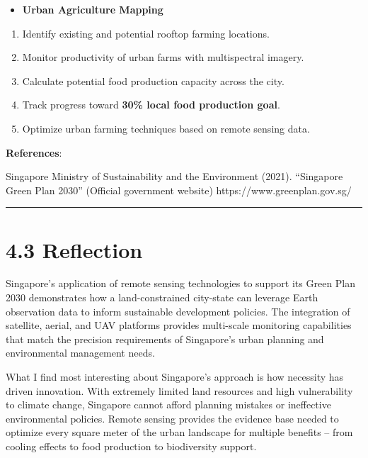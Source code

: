 \documentclass[
  letterpaper,
  DIV=11,
  numbers=noendperiod]{scrreprt}
\providecommand{\tightlist}{%
  \setlength{\itemsep}{0pt}\setlength{\parskip}{0pt}}\usepackage{longtable,booktabs,array}
\begin{document}
\begin{itemize}
\tightlist
\item
  \textbf{Urban Agriculture Mapping}
\end{itemize}

\begin{enumerate}
\def\labelenumi{\arabic{enumi}.}
\tightlist
\item
  Identify existing and potential rooftop farming locations.
\item
  Monitor productivity of urban farms with multispectral imagery.
\item
  Calculate potential food production capacity across the city.
\item
  Track progress toward \textbf{30\% local food production goal}.
\item
  Optimize urban farming techniques based on remote sensing data.
\end{enumerate}

\textbf{References}:

Singapore Ministry of Sustainability and the Environment (2021).
``Singapore Green Plan 2030'' (Official government website)
https://www.greenplan.gov.sg/

\begin{center}\rule{0.5\linewidth}{0.5pt}\end{center}

\section{4.3 Reflection}\label{reflection-2}

Singapore's application of remote sensing technologies to support its
Green Plan 2030 demonstrates how a land-constrained city-state can
leverage Earth observation data to inform sustainable development
policies. The integration of satellite, aerial, and UAV platforms
provides multi-scale monitoring capabilities that match the precision
requirements of Singapore's urban planning and environmental management
needs.

What I find most interesting about Singapore's approach is how necessity
has driven innovation. With extremely limited land resources and high
vulnerability to climate change, Singapore cannot afford planning
mistakes or ineffective environmental policies. Remote sensing provides
the evidence base needed to optimize every square meter of the urban
landscape for multiple benefits -- from cooling effects to food
production to biodiversity support.
\end{document}

